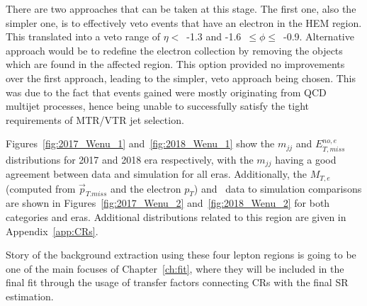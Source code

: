 \hspace{10pt} There are two approaches that can be taken at this stage. The first one, also the simpler one, is to effectively veto events that have an electron in the HEM region. This translated into a veto range of $\eta <$~-1.3 and -1.6~$\leq\phi\leq$~-0.9. Alternative approach would be to redefine the electron collection by removing the objects which are found in the affected region. This option provided no improvements over the first approach, leading to the simpler, veto approach being chosen. This was due to the fact that events gained were mostly originating from QCD multijet processes, hence being unable to successfully satisfy the tight requirements of MTR/VTR jet selection.

\hspace{10pt} Figures~\ref{fig:2017_Wenu_1} and~\ref{fig:2018_Wenu_1} show the $m_{jj}$ and $E_{T,miss}^{no,e}$ distributions for 2017 and 2018 era respectively, with the $m_{jj}$ having a good agreement between data and simulation for all eras. Additionally, the $M_{T,e}$ (computed from $\vec{p}_{T.miss}$ and the electron $p_T$) and \mindphinoe~data to simulation comparisons are shown in Figures~\ref{fig:2017_Wenu_2} and~\ref{fig:2018_Wenu_2} for both categories and eras. Additional distributions related to this region are given in Appendix~\ref{app:CRs}. 

\hspace{10pt} Story of the background extraction using these four lepton regions is going to be one of the main focuses of Chapter~\ref{ch:fit}, where they will be included in the final fit through the usage of transfer factors connecting CRs with the final SR estimation.


